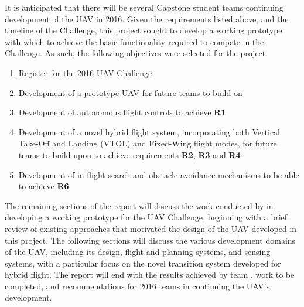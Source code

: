 It is anticipated that there will be several Capstone student teams continuing development of the UAV in 2016. Given the requirements listed above, and the timeline of the Challenge, this project sought to develop a working prototype with which to achieve the basic functionality required to compete in the Challenge. As such, the following objectives were selected for the project:
\begin{enumerate}[label=\bfseries O\arabic*:] \itemsep-2pt
	\item Register for the 2016 UAV Challenge
	\item Development of a prototype UAV for future teams to build on
	\item Development of autonomous flight controls to achieve \textbf{R1}
	\item Development of a novel hybrid flight system, incorporating both Vertical Take-Off and Landing (VTOL) and Fixed-Wing flight modes, for future teams to build upon to achieve requirements \textbf{R2}, \textbf{R3} and \textbf{R4}
	\item Development of in-flight search and obstacle avoidance mechanisms to be able to achieve \textbf{R6}
\end{enumerate}

The remaining sections of the report will discuss the work conducted by \ID in developing a working prototype for the UAV Challenge, beginning with a brief review of existing approaches that motivated the design of the UAV developed in this project. The following sections will discuss the various development domains of the UAV, including its design, flight and planning systems, and sensing systems, with a particular focus on the novel transition system developed for hybrid flight. The report will end with the results achieved by team \ID, work to be completed, and recommendations for 2016 teams in continuing the UAV's development.